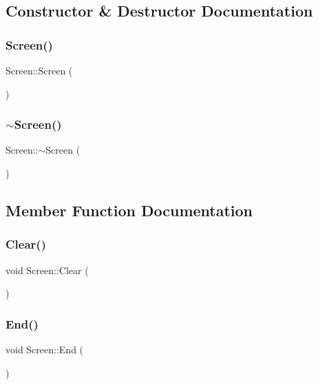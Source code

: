 \subsection{Constructor \& Destructor Documentation}
\mbox{\label{class_screen_ae7576476fc6e6a6eaa66389fdc41fe72}} 
\subsubsection{\texorpdfstring{Screen()}{Screen()}}
{\footnotesize\ttfamily Screen\+::\+Screen (\begin{DoxyParamCaption}{ }\end{DoxyParamCaption})}

\mbox{\label{class_screen_a4243bc17596af96415b09ac48205676d}} 
\subsubsection{\texorpdfstring{$\sim$\+Screen()}{~Screen()}}
{\footnotesize\ttfamily Screen\+::$\sim$\+Screen (\begin{DoxyParamCaption}{ }\end{DoxyParamCaption})}



\subsection{Member Function Documentation}
\mbox{\label{class_screen_aef2c4e4e116cc5d1321392545cba6caa}} 
\subsubsection{\texorpdfstring{Clear()}{Clear()}}
{\footnotesize\ttfamily void Screen\+::\+Clear (\begin{DoxyParamCaption}{ }\end{DoxyParamCaption})}

\mbox{\label{class_screen_af1db8b519ceea7831567c8a1e59ff6f7}} 
\subsubsection{\texorpdfstring{End()}{End()}}
{\footnotesize\ttfamily void Screen\+::\+End (\begin{DoxyParamCaption}{ }\end{DoxyParamCaption})}

